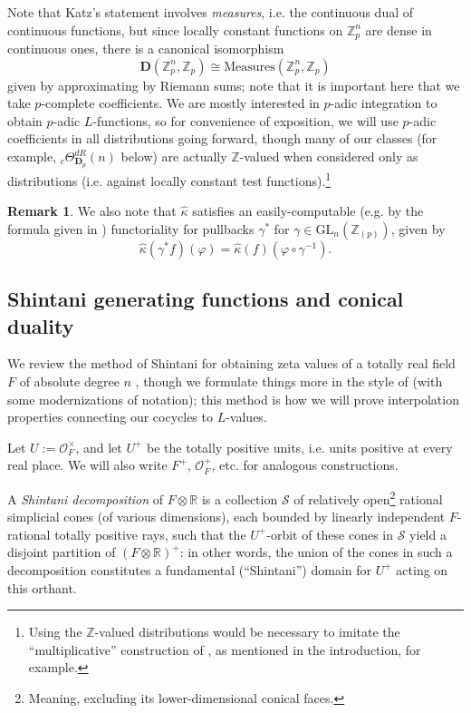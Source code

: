 \documentclass[10pt]{amsart}
\theoremstyle{definition}
\newtheorem{rem}[thm]{Remark}
\newcommand{\Z}{\mathbb{Z}}
\newcommand{\R}{\mathbb{R}}
\newcommand{\D}{\mathbf{D}}
\newcommand{\GL}{\mathrm{GL}}
\numberwithin{equation}{section}
\begin{document}
    Note that Katz's statement involves \emph{measures}, i.e. the continuous dual of continuous functions, but since locally constant functions on $\Z_p^n$ are dense in continuous ones, there is a canonical isomorphism 
    \[
        \D(\Z_p^n, \Z_p) \cong \mathrm{Measures}(\Z_p^n, \Z_p)
    \]
    given by approximating by Riemann sums; note that it is important here that we take $p$-complete coefficients. We are mostly interested in $p$-adic integration to obtain $p$-adic $L$-functions, so for convenience of exposition, we will use $p$-adic coefficients in all distributions going forward, though many of our classes (for example, ${}_c\Theta^{dR}_{\D_p}(n)$ below) are actually $\Z$-valued when considered only as distributions (i.e. against locally constant test functions).\footnote{Using the $\Z$-valued distributions would be necessary to imitate the ``multiplicative'' construction of \cite{RX2}, as mentioned in the introduction, for example.}

    \begin{rem} \label{rem:imdone}
        We also note that $\widehat{\kappa}$ satisfies an easily-computable (e.g. by the formula given in \cite[Theorem 1]{Katz}) functoriality for pullbacks $\gamma^*$ for $\gamma\in \GL_n(\Z_{(p)})$, given by
        \[
        \widehat{\kappa}(\gamma^* f)(\varphi) = \widehat{\kappa}(f)(\varphi\circ \gamma^{-1}).
        \]
    \end{rem}
    
    \subsection{Shintani generating functions and conical duality} \label{section:cones}

    We review the method of Shintani for obtaining zeta values of a totally real field $F$ of absolute degree $n$ \cite{Shin}, though we formulate things more in the style of \cite{Katz} (with some modernizations of notation); this method is how we will prove interpolation properties connecting our cocycles to $L$-values.
    
    Let $U:=\mathcal{O}_F^\times$, and let $U^+$ be the totally positive units, i.e. units positive at every real place. We will also write $F^+$, $\mathcal{O}_F^+$, etc. for analogous constructions.
    
    A \emph{Shintani decomposition} of $F\otimes \R$ is a collection $\mathscr{S}$ of relatively open\footnote{Meaning, excluding its lower-dimensional conical faces.} rational simplicial cones (of various dimensions), each bounded by linearly independent $F$-rational totally positive rays, such that the $U^+$-orbit of these cones in $\mathscr{S}$ yield a disjoint partition of $(F\otimes \R)^+$: in other words, the union of the cones in such a decomposition constitutes a fundamental (``Shintani'') domain for $U^+$ acting on this orthant. 
    
\end{document}
